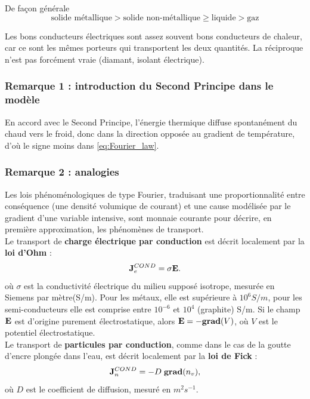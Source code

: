 \documentclass[11pt,a4paper]{report}
\begin{document}
De façon générale
\begin{equation}
	\boxed{\text{solide métallique} > \text{solide non-métallique} 
	\geq \text{liquide} > \text{gaz}}
\end{equation}

Les bons conducteurs électriques sont assez souvent bons conducteurs de chaleur, car ce sont les mêmes porteurs qui transportent les deux quantités. La réciproque n'est pas forcément vraie (diamant, isolant électrique).

\subsubsection{Remarque 1 : introduction du Second Principe dans le modèle}
En accord avec le Second Principe, l'énergie thermique diffuse spontanément du chaud vers le froid, donc dans la direction opposée au gradient de température, d'où le signe moins dans \eqref{eq:Fourier_law}.

\subsubsection{Remarque 2 : analogies}

Les lois phénoménologiques de type Fourier, traduisant une proportionnalité entre conséquence (une densité volumique de courant) et une cause modélisée par le gradient d'une variable intensive, sont monnaie courante pour décrire, en première approximation, les phénomènes de transport.\\

Le transport de \textbf{charge électrique par conduction} est décrit localement par la \textbf{loi d'Ohm} :
\begin{equation}
	\bold{J}_e^{COND} = \sigma \bold{E}.
\end{equation}
où $\sigma$ est la conductivité électrique du milieu supposé isotrope, mesurée en Siemens par mètre(S/m). Pour les métaux, elle est supérieure à $10^6 S/m$, pour les semi-conducteurs elle est comprise entre $10^{-6}$ et $10^{4}$ (graphite) S/m. Si le champ $\bold{E}$ est d'origine purement électrostatique, alors $\bold{E} = -\textbf{grad}(V)$, où $V$ est le potentiel électrostatique.\\

Le transport de \textbf{particules par conduction}, comme dans le cas de la goutte d'encre plongée dans l'eau, est décrit localement par la \textbf{loi de Fick} :
\begin{equation}
	\bold{J}_n^{COND} = - D\;\textbf{grad}(n_v),
\end{equation}
où $D$ est le coefficient de diffusion, mesuré en $m^2s^{-1}$.\\
\end{document}
